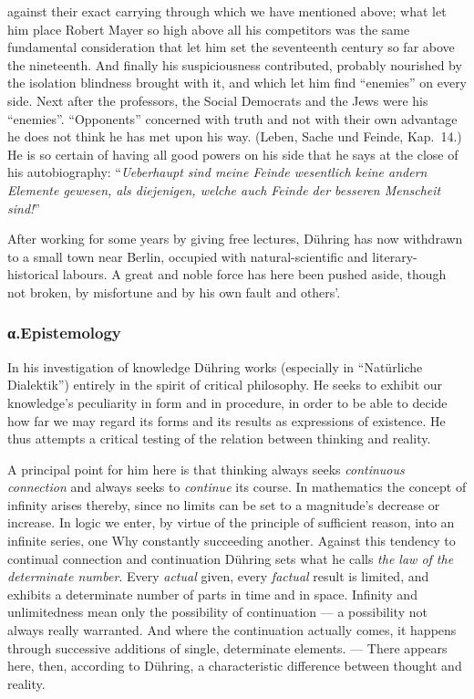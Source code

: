\documentclass[12pt,a4paper]{book}
\newcommand{\opage}[1]{\marginnote{\footnotesize\textit{[#1]}}}
\begin{document}
against their exact carrying through which we have mentioned above; what let him
place Robert Mayer so high above all his competitors was the same fundamental
consideration that let him set the seventeenth century so far above the
nineteenth. And finally his suspiciousness contributed, probably nourished by the
isolation blindness brought with it, and which let him find ``enemies'' on every
side. Next after the professors, the Social Democrats and the Jews were his
``enemies''. ``Opponents'' concerned with truth and not with their own advantage
he does not think he has met upon his way. (Leben, Sache und Feinde, Kap.~14.) He
is \opage{557}so certain of having all good powers on his side that he says at the close of
his autobiography: ``\textit{Ueberhaupt sind meine Feinde wesentlich keine andern
Elemente gewesen, als diejenigen, welche auch Feinde der besseren Menscheit
sind!}''

After working for some years by giving free lectures, Dühring has now withdrawn
to a small town near Berlin, occupied with natural-scientific and
literary-historical labours. A great and noble force has here been pushed aside,
though not broken, by misfortune and by his own fault and others'.

\subsubsection*{α.\quad Epistemology}

In his investigation of knowledge Dühring works (especially in ``Natürliche
Dialektik'') entirely in the spirit of critical philosophy. He seeks to exhibit
our knowledge's peculiarity in form and in procedure, in order to be able to
decide how far we may regard its forms and its results as expressions of
existence. He thus attempts a critical testing of the relation between thinking
and reality.

A principal point for him here is that thinking always seeks \emph{continuous
connection} and always seeks to \emph{continue} its course. In mathematics the
concept of infinity arises thereby, since no limits can be set to a magnitude's
decrease or increase. In logic we enter, by virtue of the principle of sufficient
reason, into an infinite series, one Why constantly succeeding another. Against
this tendency to continual connection and continuation Dühring sets what he calls
\emph{the law of the determinate number}. Every \emph{actual} given, every
\emph{factual} result is limited, and exhibits a determinate number of parts in
time and in space. Infinity and unlimitedness mean only the possibility of
continuation --- a possibility not always really warranted. And where the
continuation actually comes, it happens through successive additions of single,
determinate elements. --- There appears here, then, according to Dühring, a
characteristic difference between thought and reality.
\end{document}
